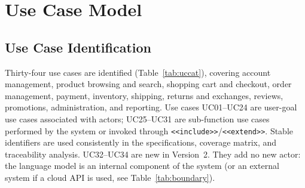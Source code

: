 \documentclass[11pt,a4paper,oneside]{extreport}
\newif\ifshowvtwo
\newcommand{\upd}[1]{\ifshowvtwo\textcolor{red}{#1}\else#1\fi}
\begin{document}
\section{Use Case Model}
\label{sec:ucmodel}

\subsection{Use Case Identification}
\upd{Thirty-four} use cases are identified (Table~\ref{tab:uccat}), covering account management, product browsing and search, shopping cart and checkout, order management, payment, inventory, shipping, returns and exchanges, reviews, promotions, administration, and reporting. Use cases UC01--UC24 are user-goal use cases associated with actors; UC25--UC31 are sub-function use cases performed by the system or invoked through \texttt{<<include>>}/\texttt{<<extend>>}. Stable identifiers are used consistently in the specifications, coverage matrix, and traceability analysis. \upd{UC32--UC34 are new in Version~2. They add no new actor: the language model is an internal component of the system (or an external system if a cloud API is used, see Table~\ref{tab:boundary}).}
\end{document}
